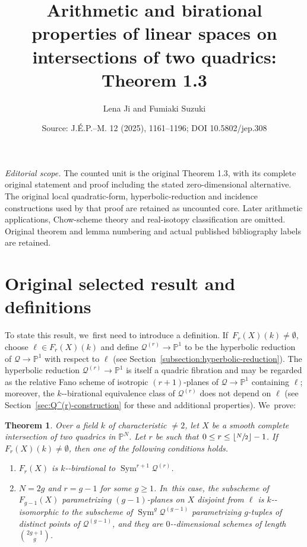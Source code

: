 \documentclass[10pt,a4paper]{amsart}
\title{Arithmetic and birational properties of linear spaces on intersections of two quadrics: Theorem 1.3}
\author{Lena Ji and Fumiaki Suzuki}
\date{Source: J.\'E.P.--M. 12 (2025), 1161--1196; DOI 10.5802/jep.308}
\providecommand{\nobreakdash}{\nobreak\hbox{-}}
\theoremstyle{plain}
\newtheorem{thm}{Theorem}[section]
\theoremstyle{definition}
\DeclareMathOperator{\Sym}{Sym}
\renewcommand\P{\mathbb{P}}
\begin{document}
\maketitle
\noindent\textit{Editorial scope.} The counted unit is the original Theorem 1.3, with its complete original statement and proof including the stated zero-dimensional alternative. The original local quadratic-form, hyperbolic-reduction and incidence constructions used by that proof are retained as uncounted core. Later arithmetic applications, Chow-scheme theory and real-isotopy classification are omitted. Original theorem and lemma numbering and actual published bibliography labels are retained.
\section{Original selected result and definitions}
To state this result, we~first need to introduce a definition. If~$F_{r}(X)(k)\neq\emptyset$, choose $\ell \in F_r(X)(k)$ and define $\mathcal{Q}^{(r)}\to \P^1$ to be the hyperbolic reduction of $\mathcal{Q}\to \P^1$ with respect to $\ell$ (see Section~\ref{subsection:hyperbolic-reduction}).
The hyperbolic reduction $\mathcal{Q}^{(r)}\to \P^1$ is itself a quadric fibration
and may be regarded as the relative Fano scheme of isotropic $(r+1)$-planes of $\mathcal{Q}\to \P^1$ containing $\ell$;
moreover, the $k$\nobreakdash-birational equivalence class of $\mathcal{Q}^{(r)}$ does not depend on $\ell$ (see Section~\ref{sec:Q^(r)-construction} for these and additional properties). We~prove:

\setcounter{thm}{2}
\begin{thm}\label{thm:symmetric}
Over a field $k$ of characteristic $\neq 2$, let $X$ be a smooth complete intersection of two quadrics in $\P^N$.
Let $r$ be such that $0\leq r\leq \lfloor \sfrac{N}{2}\rfloor -1$. If~$F_r(X)(k)\neq \emptyset$, then one of the following conditions holds.
\begin{enumerate}
\item\label{thm:symmetric1} $F_r(X)$ is $k$\nobreakdash-birational to $\Sym^{r+1}\mathcal{Q}^{(r)}$.
\item\label{thm:symmetric2} $N=2g$ and $r=g-1$ for some $g\geq 1$. In~this case,
the subscheme of $F_{g-1}(X)$ parametrizing $(g-1)$-planes on $X$
disjoint from $\ell$ is $k$\nobreakdash-isomorphic to
the subscheme of $\Sym^{g}\mathcal{Q}^{(g-1)}$ parametrizing $g$-tuples of distinct points of $\mathcal{Q}^{(g-1)}$, and they are \(0\)\nobreakdash-dimensional schemes of length $\binom{2g+1}{g}$.
\end{enumerate}
\end{thm}
\end{document}

